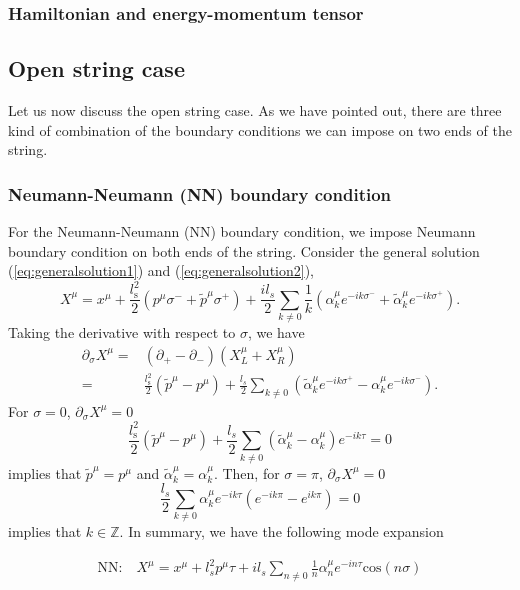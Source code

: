 \documentclass[graybox,envcountchap,sectrefs]{svmono}
\begin{document}
\subsubsection*{Hamiltonian and energy-momentum tensor}



\subsection{Open string case}
Let us now discuss the open string case. As we have pointed out, there are three kind of combination of the boundary conditions we can impose on two ends of the string.
\subsubsection*{Neumann-Neumann (NN) boundary condition}
For the Neumann-Neumann (NN) boundary condition, we impose Neumann boundary condition on both ends of the string. Consider the general solution (\ref{eq:generalsolution1}) and (\ref{eq:generalsolution2}), 
\begin{equation}
X^{\mu}=x^{\mu}+\frac{l_{\mathrm{s}}^2}{2}(p^{\mu}\sigma^-+\tilde{p}^{\mu}\sigma^+)
+\frac{il_{s}}{2}\sum_{k\neq 0}\frac{1}{k}(\alpha_k^{\mu}e^{-ik\sigma^-}+\tilde{\alpha}_k^{\mu}e^{-ik\sigma^+}).
\end{equation}
Taking the derivative with respect to $\sigma$, we have 
\begin{align}
\partial_{\sigma}{X}^{\mu}=&	(\partial_+-\partial_{-})(X_L^{\mu}+X^{\mu}_R)\nonumber\\
=&\frac{l_{\mathrm{s}}^2}{2}(\tilde{p}^{\mu}-p^{\mu})
+\frac{l_{s}}{2}\sum_{k\neq 0}(\tilde{\alpha}_k^{\mu}e^{-ik\sigma^+}-\alpha_k^{\mu}e^{-ik\sigma^-}).
\end{align}
For $\sigma=0$, $\partial_{\sigma}{X}^{\mu}=0$
\begin{equation}
	\frac{l_{\mathrm{s}}^2}{2}(\tilde{p}^{\mu}-p^{\mu})
+\frac{l_{s}}{2}\sum_{k\neq 0}(\tilde{\alpha}_k^{\mu}-\alpha_k^{\mu})e^{-ik\tau}=0
\end{equation}
implies that $\tilde{p}^{\mu}=p^{\mu}$ and $\tilde{\alpha}_k^{\mu}=\alpha_k^{\mu}$.
Then, for $\sigma=\pi$, $\partial_{\sigma}{X}^{\mu}=0$
\begin{equation}
\frac{l_{s}}{2}\sum_{k\neq 0}{\alpha}_k^{\mu}e^{-ik\tau}(e^{-ik\pi}-e^{ik\pi})=0	
\end{equation}
implies that $k\in \mathbb{Z}$. 
In summary, we have the following mode expansion
\begin{svgraybox}
\begin{align}
\text{NN:}\quad	 X^{\mu}=x^{\mu}+l_s^2p^{\mu}\tau+il_s\sum_{n\neq 0}\frac{1}{n}\alpha_n^{\mu} e^{-in\tau} \mathrm{cos}(n\sigma)
\end{align}	
\end{svgraybox}
\end{document}
